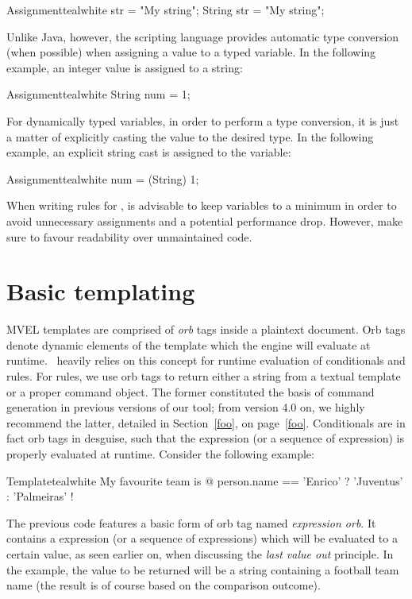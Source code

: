 \begin{codebox}{Assignment}{teal}{\icnote}{white}
str = "My string";
String str = "My string";
\end{codebox}

Unlike Java, however, the scripting language provides automatic type conversion (when possible) when assigning a value to a typed variable. In the following example, an integer value is assigned to a string:

\begin{codebox}{Assignment}{teal}{\icnote}{white}
String num = 1;
\end{codebox}

For dynamically typed variables, in order to perform a type conversion, it is just a matter of explicitly casting the value to the desired type. In the following example, an explicit string cast is assigned to the  variable:

\begin{codebox}{Assignment}{teal}{\icnote}{white}
num = (String) 1;
\end{codebox}

When writing rules for \arara, is advisable to keep variables to a minimum in order to avoid unnecessary assignments and a potential performance drop. However, make sure to favour readability over unmaintained code.

\section{Basic templating}
\label{sec:mvelbasictemplating}

MVEL templates are comprised of \emph{orb} tags inside a plaintext document. Orb tags denote dynamic elements of the template which the engine will evaluate at runtime. \arara\ heavily relies on this concept for runtime evaluation of conditionals and rules. For rules, we use orb tags to return either a string from a textual template or a proper command object. The former constituted the basis of command generation in previous versions of our tool; from version 4.0 on, we highly recommend the latter, detailed in Section~\ref{foo}, on page~\ref{foo}. Conditionals are in fact orb tags in desguise, such that the expression (or a sequence of expression) is properly evaluated at runtime. Consider the following example:

\begin{codebox}{Template}{teal}{\icnote}{white}
My favourite team is @{ person.name == 'Enrico'
? 'Juventus' : 'Palmeiras' }!
\end{codebox}

The previous code features a basic form of orb tag named \emph{expression orb}. It contains a expression (or a sequence of expressions) which will be evaluated to a certain value, as seen earlier on, when discussing the \emph{last value out} principle. In the example, the value to be returned will be a string containing a football team name (the result is of course based on the comparison outcome).

